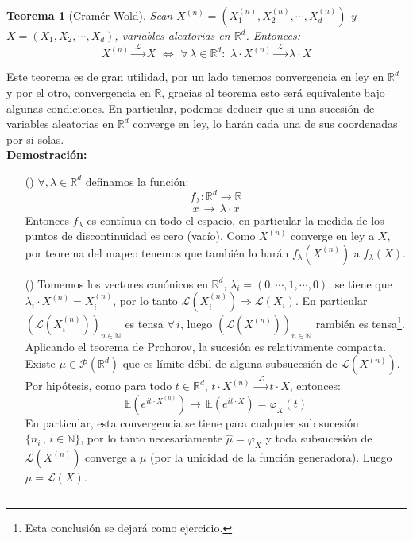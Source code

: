 \documentclass[a4paper]{article}
\newtheorem{teorema}{Teorema}
\numberwithin{equation}{subsection}
\def\R{\mathbb R}
\def\N{\mathbb N}
\def\E{\mathbb E}
\begin{document}
\begin{teorema}[Cramér-Wold] Sean $X^{(n)} = (X_1^{(n)},X_2^{(n)},\cdots,X_d^{(n)})$ y $X=(X_1,X_2,\cdots,X_d)$, variables aleatorias en $\R^d$. Entonces:
\[X^{(n)}\xrightarrow{\,\,\mathcal{L}\,\,}X\,\,\Longleftrightarrow\,\,\forall\,\lambda\in\R^d:\,\,\lambda\cdot X^{(n)}\xrightarrow{\,\,\mathcal{L}\,\,}\lambda\cdot X\]
\end{teorema}
Este teorema es de gran utilidad, por un lado tenemos convergencia en ley en $\R^d$ y por el otro, convergencia en $\R$, gracias al teorema esto será equivalente bajo algunas condiciones. En particular, podemos deducir que si una sucesión de variables aleatorias en $\R^d$ converge en ley, lo harán cada una de sus coordenadas por si solas.\\ \newline
\textbf{Demostración: }
\begin{itemize}
    \item[(\Rightarrow)]  $\forall,\lambda\in\R^d$ definamos la función:
    \[f_{\lambda}: \R^d\rightarrow\R\]
    \[x\,\rightarrow\,\lambda\cdot x\]
    Entonces $f_{\lambda}$ es contínua en todo el espacio, en particular la medida de los puntos de discontinuidad es cero (vacío). Como $X^{(n)}$ converge en ley a $X$, por teorema del mapeo tenemos que también lo harán $f_{\lambda}(X^{(n)})$ a $f_{\lambda}(X)$.
    \item[(\Leftarrow)] Tomemos los vectores canónicos en $\R^d$, $\lambda_i = (0,\cdots,1,\cdots,0)$, se tiene que $\lambda_i \cdot X^{(n)} = X_i^{(n)}$, por lo tanto $\mathcal{L}(X_i^{(n)})\Rightarrow \mathcal{L}(X_i)$. En particular $\left(\mathcal{L}(X_i^{(n)})\right)_{n\in\N}$ es tensa $\forall\,i$, luego $\left(\mathcal{L}(X^{(n)})\right)_{n\in\N}$ rambién es tensa\footnote{Esta conclusión se dejará como ejercicio.}. Aplicando el teorema de Prohorov, la sucesión es relativamente compacta. \\ \newline
    Existe $\mu\in\mathcal{P}(\R^d)$ que es límite débil de alguna subsucesión de $\mathcal{L}(X^{(n)})$. Por hipótesis,  como para todo $t\in\R^d$, $t\cdot X^{(n)}\,\xrightarrow{\,\,\mathcal{L}\,\,}t\cdot X$, entonces:
    \[\E(e^{it\cdot X^{(n)}}) \rightarrow\,\E(e^{it\cdot X}) = \varphi_X(t)\]
    En particular, esta convergencia se tiene para cualquier sub sucesión $\{n_i\,,\,i\in\N\}$, por lo tanto necesariamente $\hat{\mu}=\varphi_X$ y toda subsucesión de $\mathcal{L}(X^{(n)})$ converge a $\mu$ (por la unicidad de la función generadora). Luego $\mu = \mathcal{L}(X)$. 
\end{itemize}
\rule{0.7em}{0.7em}
\end{document}
